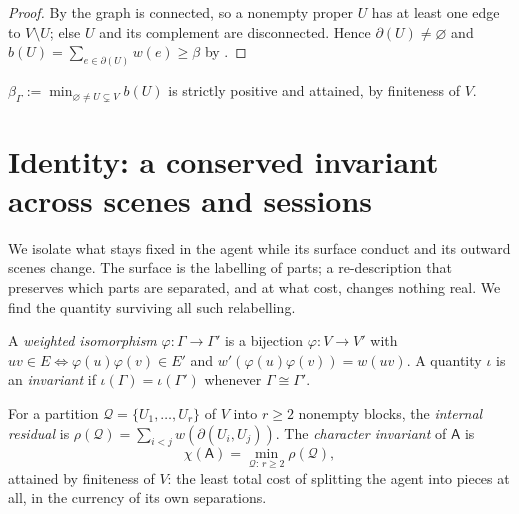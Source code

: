 \documentclass[11pt,twocolumn,a4paper]{article}
\newcommand{\Agent}{\mathsf{A}}
\newcommand{\Self}{\Gamma}          %
\newcommand{\V}{V}
\newcommand{\E}{E}
\newcommand{\wt}{w}
\newcommand{\floorc}{\beta}          %
\newcommand{\cut}{\partial}
\newcommand{\Char}{\chi}             %
\begin{document}
\begin{proof}
By  the graph is connected, so a nonempty proper $U$ has
at least one edge to $\V\setminus U$; else $U$ and its complement are
disconnected. Hence $\cut(U)\neq\varnothing$ and
$b(U)=\sum_{e\in\cut(U)}\wt(e)\ge\floorc$ by .
\end{proof}

\begin{corollary}
\label{cor:realised}
$\floorc_\Self:=\min_{\varnothing\neq U\subsetneq\V}b(U)$ is strictly
positive and attained, by finiteness of $\V$.
\end{corollary}

\section{Identity: a conserved invariant across scenes and sessions}
\label{sec:identity}

We isolate what stays fixed in the agent while its surface conduct and its
outward scenes change. The surface is the labelling of parts; a
re-description that preserves which parts are separated, and at what cost,
changes nothing real. We find the quantity surviving all such relabelling.

\begin{definition}
\label{def:iso}
A \emph{weighted isomorphism} $\varphi:\Self\to\Self'$ is a bijection
$\varphi:\V\to\V'$ with $uv\in\E\iff\varphi(u)\varphi(v)\in\E'$ and
$\wt'(\varphi(u)\varphi(v))=\wt(uv)$. A quantity $\iota$ is an
\emph{invariant} if $\iota(\Self)=\iota(\Self')$ whenever
$\Self\cong\Self'$.
\end{definition}

\begin{definition}
\label{def:char}
For a partition $\mathcal{Q}=\{U_1,\dots,U_r\}$ of $\V$ into $r\ge2$
nonempty blocks, the \emph{internal residual} is
$\rho(\mathcal{Q})=\sum_{i<j}\wt(\cut(U_i,U_j))$. The \emph{character
invariant} of $\Agent$ is
\[
\Char(\Agent)=\min_{\mathcal{Q}:\,r\ge2}\rho(\mathcal{Q}),
\]
attained by finiteness of $\V$: the least total cost of splitting the
agent into pieces at all, in the currency of its own separations.
\end{definition}
\end{document}
